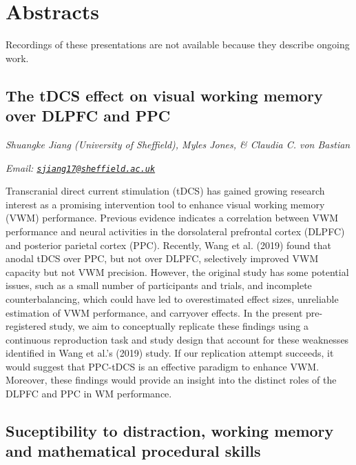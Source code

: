 \documentclass[12pt,]{book}
\begin{document}
\hypertarget{abstracts-6}{%
\section{Abstracts}\label{abstracts-6}}

Recordings of these presentations are not available because they describe ongoing work.

\hypertarget{the-tdcs-effect-on-visual-working-memory-over-dlpfc-and-ppc}{%
\subsection{The tDCS effect on visual working memory over DLPFC and PPC}\label{the-tdcs-effect-on-visual-working-memory-over-dlpfc-and-ppc}}

\emph{Shuangke Jiang (University of Sheffield), Myles Jones, \& Claudia C. von Bastian}

\emph{Email: \href{mailto:sjiang17@sheffield.ac.uk}{\nolinkurl{sjiang17@sheffield.ac.uk}}}

Transcranial direct current stimulation (tDCS) has gained growing research interest as a promising intervention tool to enhance visual working memory (VWM) performance. Previous evidence indicates a correlation between VWM performance and neural activities in the dorsolateral prefrontal cortex (DLPFC) and posterior parietal cortex (PPC). Recently, Wang et al. (2019) found that anodal tDCS over PPC, but not over DLPFC, selectively improved VWM capacity but not VWM precision. However, the original study has some potential issues, such as a small number of participants and trials, and incomplete counterbalancing, which could have led to overestimated effect sizes, unreliable estimation of VWM performance, and carryover effects. In the present pre-registered study, we aim to conceptually replicate these findings using a continuous reproduction task and study design that account for these weaknesses identified in Wang et al.'s (2019) study. If our replication attempt succeeds, it would suggest that PPC-tDCS is an effective paradigm to enhance VWM. Moreover, these findings would provide an insight into the distinct roles of the DLPFC and PPC in WM performance.

\hypertarget{suceptibility-to-distraction-working-memory-and-mathematical-procedural-skills}{%
\subsection{Suceptibility to distraction, working memory and mathematical procedural skills}\label{suceptibility-to-distraction-working-memory-and-mathematical-procedural-skills}}
\end{document}
